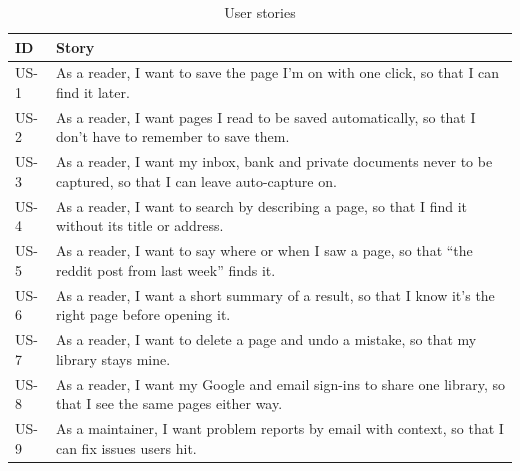 \begin{table}[!htbp]
\centering
\small
\begin{tabularx}{\textwidth}{>{\ttfamily}p{} L}
\toprule
\textrm{\textbf{ID}} & \textbf{Story} \\
\midrule
US-1 & As a reader, I want to save the page I'm on with one click, so that I can find it later. \\
US-2 & As a reader, I want pages I read to be saved automatically, so that I don't have to remember to save them. \\
US-3 & As a reader, I want my inbox, bank and private documents never to be captured, so that I can leave auto-capture on. \\
US-4 & As a reader, I want to search by describing a page, so that I find it without its title or address. \\
US-5 & As a reader, I want to say where or when I saw a page, so that ``the reddit post from last week'' finds it. \\
US-6 & As a reader, I want a short summary of a result, so that I know it's the right page before opening it. \\
US-7 & As a reader, I want to delete a page and undo a mistake, so that my library stays mine. \\
US-8 & As a reader, I want my Google and email sign-ins to share one library, so that I see the same pages either way. \\
US-9 & As a maintainer, I want problem reports by email with context, so that I can fix issues users hit. \\
\bottomrule
\end{tabularx}
\caption{User stories}
\label{tab:stories}
\end{table}

